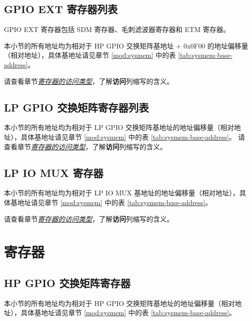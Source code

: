 \documentclass[main\_\_CN.tex]{subfiles}
\begin{document}
\subsection{GPIO EXT 寄存器列表}
GPIO EXT 寄存器包括 SDM 寄存器、毛刺滤波器寄存器和 ETM 寄存器。

本小节的所有地址均为相对于 HP GPIO 交换矩阵基地址 + 0x0F00 的地址偏移量（相对地址），具体基地址请见章节  \ref{mod:sysmem} \textit{} 中的表 \ref{tab:sysmem-base-address}。

请查看章节\hyperref[glossary-access-types]{\textit{寄存器的访问类型}}，了解\textbf{访问}列缩写的含义。



\subsection{LP GPIO 交换矩阵寄存器列表}
\label{sec:lp-gpio-register-summ}

本小节的所有地址均为相对于 LP GPIO 交换矩阵基地址的地址偏移量（相对地址），具体基地址请见章节 \ref{mod:sysmem} \textit{} 中的表 \ref{tab:sysmem-base-address}。
请查看章节\hyperref[glossary-access-types]{\textit{寄存器的访问类型}}，了解\textbf{访问}列缩写的含义。



\subsection{LP IO MUX 寄存器}
\label{sec:lp-iomux-register-summ}

本小节的所有地址均为相对于 LP IO MUX 基地址的地址偏移量（相对地址），具体基地址请见章节 \ref{mod:sysmem} \textit{} 中的表 \ref{tab:sysmem-base-address}。

请查看章节\hyperref[glossary-access-types]{\textit{寄存器的访问类型}}，了解\textbf{访问}列缩写的含义。



\section{寄存器}

\subsection{HP GPIO 交换矩阵寄存器}
本小节的所有地址均为相对于 HP GPIO 交换矩阵基地址的地址偏移量（相对地址），具体基地址请见章节 \ref{mod:sysmem} \textit{} 中的表 \ref{tab:sysmem-base-address}。
\end{document}
